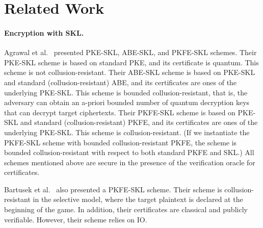 \section{Related Work}
\label{sec:related_work}
\paragraph{Encryption with SKL.}
Agrawal et al.~\cite{EC:AKNYY23} presented PKE-SKL, ABE-SKL, and PKFE-SKL schemes.
Their PKE-SKL scheme is based on standard PKE, and its certificate is quantum. This scheme is not collusion-resistant.
Their ABE-SKL scheme is based on PKE-SKL and standard (collusion-resistant) ABE, and its certificates are ones of the underlying PKE-SKL.
This scheme is bounded collusion-resistant, that is, the adversary can
obtain an a-priori bounded number of quantum decryption keys that can decrypt target ciphertexts.
Their PKFE-SKL scheme is based on PKE-SKL and standard (collusion-resistant) PKFE, and its certificates are ones of the underlying PKE-SKL.
This scheme is collusion-resistant. (If we instantiate the PKFE-SKL scheme with bounded collusion-resistant PKFE, the scheme is bounded collusion-resistant with respect to both standard PKFE and SKL.)
All schemes mentioned above are secure in the presence of the verification oracle for certificates.

Bartusek et al.~\cite{EC:BGKMRR24} also presented a PKFE-SKL scheme.
Their scheme is collusion-resistant in the selective model, where the target plaintext is declared at the beginning of the game. In addition, their certificates are classical and publicly verifiable. However, their scheme relies on IO.

